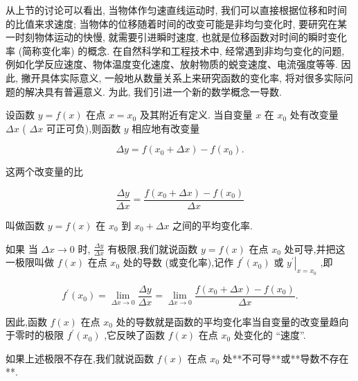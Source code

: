 \documentclass[lang=cn,newtx,12pt,scheme=chinese]{elegantbook}
\begin{document}
从上节的讨论可以看出, 当物体作匀速直线运动时, 我们可以直接根据位移和时间的比值来求速度; 当物体的位移随着时间的改变可能是非均匀变化时, 要研究在某一时刻物体运动的快慢, 就需要引进瞬时速度, 也就是位移函数对时间的瞬时变化率 (简称变化率) 的概念. 在自然科学和工程技术中, 经常遇到非均匀变化的问题, 例如化学反应速度、物体温度变化速度、放射物质的蜕变速度、电流强度等等. 因此, 撇开具体实际意义, 一般地从数量关系上来研究函数的变化率, 将对很多实际问题的解决具有普遍意义. 为此, 我们引进一个新的数学概念一导数.

\begin{definition}[平均变化率]
设函数 \(y = f\left( x\right)\) 在点 \(x = {x}_{0}\) 及其附近有定义. 当自变量 \(x\) 在 \({x}_{0}\) 处有改变量 \({\Delta x}\) ( \({\Delta x}\) 可正可负),则函数 \(y\) 相应地有改变量

\[
{\Delta y} = f\left( {{x}_{0} + {\Delta x}}\right) - f\left( {x}_{0}\right) .
\]

这两个改变量的比

\[
\frac{\Delta y}{\Delta x} = \frac{f\left( {{x}_{0} + {\Delta x}}\right) - f\left( {x}_{0}\right) }{\Delta x}
\]

叫做函数 \(y = f\left( x\right)\) 在 \({x}_{0}\) 到 \({x}_{0} + {\Delta x}\) 之间的平均变化率.

\end{definition}

\begin{definition}[导数]

如果 当 \({\Delta x} \rightarrow 0\) 时, \(\frac{\Delta y}{\Delta x}\) 有极限,我们就说函数 \(y = f\left( x\right)\) 在点 \({x}_{0}\) 处可导,并把这一极限叫做 \(f\left( x\right)\) 在点 \({x}_{0}\) 处的导数 (或变化率),记作 \({f}^{\prime }\left( {x}_{0}\right)\) 或 \({\left. {y}^{\prime }\right| }_{x = {x}_{0}}\) ,即

\[
{f}^{\prime }\left( {x}_{0}\right) = \mathop{\lim }\limits_{{{\Delta x} \rightarrow 0}}\frac{\Delta y}{\Delta x} = \mathop{\lim }\limits_{{{\Delta x} \rightarrow 0}}\frac{f\left( {{x}_{0} + {\Delta x}}\right) - f\left( {x}_{0}\right) }{\Delta x}. \tag{1}
\]

\end{definition}

因此,函数 \(f\left( x\right)\) 在点 \({x}_{0}\) 处的导数就是函数的平均变化率当自变量的改变量趋向于零时的极限 \({f}^{\prime }\left( {x}_{0}\right)\) ,它反映了函数 \(f\left( x\right)\) 在点 \({x}_{0}\) 处变化的 “速度”.

如果上述极限不存在,我们就说函数 \(f\left( x\right)\) 在点 \({x}_{0}\) 处**不可导**或**导数不存在**.
\end{document}
